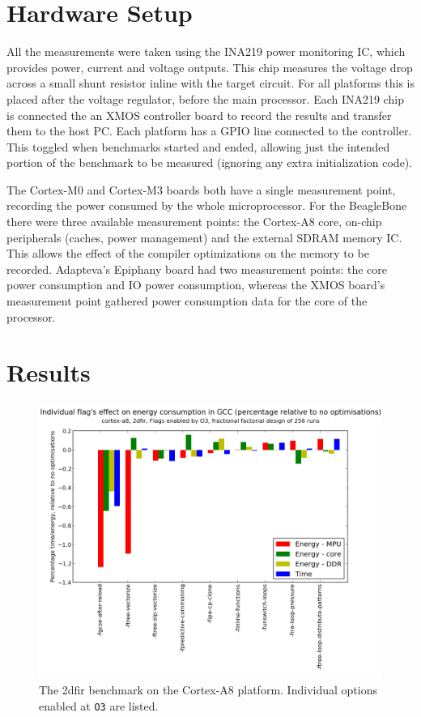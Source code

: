 \documentclass[twocolumn]{article}
\newcommand{\nsection}[1]{\section{\bfseries #1}}
\let\oldcaption\caption
\renewcommand{\caption}[1]{\oldcaption{\textup{#1}}}
\begin{document}

\nsection{Hardware Setup}

All the measurements were taken using the INA219 power monitoring IC\cite{INA219}, which provides power, current and voltage outputs. This chip measures the voltage drop across a small shunt resistor inline with the target circuit. For all platforms this is placed after the voltage regulator, before the main processor. Each INA219 chip is connected the an XMOS controller board to record the results and transfer them to the host PC. Each platform has a GPIO line connected to the controller. This toggled when benchmarks started and ended, allowing just the intended portion of the benchmark to be measured (ignoring any extra initialization code).

The Cortex-M0 and Cortex-M3 boards both have a single measurement point, recording the power consumed by the whole microprocessor. For the BeagleBone there were three available measurement points: the Cortex-A8 core, on-chip peripherals (caches, power management) and the external SDRAM memory IC. This allows the effect of the compiler optimizations on the memory to be recorded. Adapteva's Epiphany board had two measurement points: the core power consumption and IO power consumption, whereas the XMOS board's measurement point gathered power consumption data for the core of the processor.

\nsection{Results}

\begin{figure}[t]
	\includegraphics[width=\linewidth]{cortex-a8/O3_main_effects_2dfir.png}
	\caption{The 2dfir benchmark on the Cortex-A8 platform. Individual options enabled at \texttt{O3} are listed.}
	\label{Fig:O3_2dfir_A8}
\end{figure}
\end{document}
